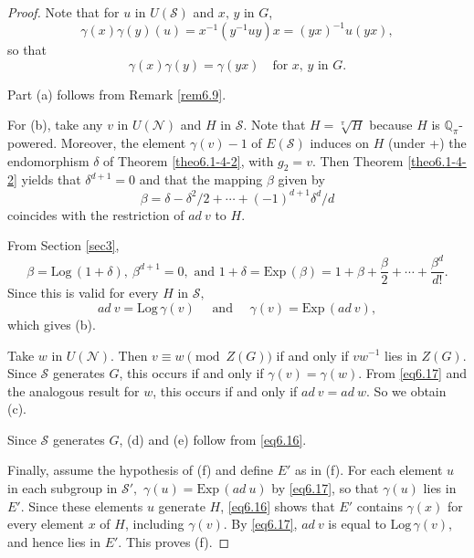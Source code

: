 \documentclass[mathscr]{amsart}
\theoremstyle{theorem}
\theoremstyle{definition}
\numberwithin{equation}{section}
\def \({\left(}
\def \){\right)}
\def\Q{\mathbb{Q}}
\def\S{\mathcal{S}}
\def \Exp{\text{Exp}\,}
\def \Log{\text{Log}\,}
\begin{document}
\begin{proof}
Note that for $u$ in $U(\S)$ and $x,\,y$ in $G$,
$$\gamma(x)\gamma(y)(u)=x^{-1}\(y^{-1}uy\)x=(yx)^{-1}u(yx),$$
so that
\begin{equation}\label{eq6.16}
\gamma(x)\gamma(y)=\gamma(yx)\quad\text{for $x,\,y$ in $G.$}
\end{equation}

Part (a) follows from Remark \ref{rem6.9}.

For (b), take any $v$ in $U(\mathcal{N})$ and $H$ in $\S$. Note that
$H=\sqrt[\pi]{H}$ because $H$ is $\Q_\pi$-powered. Moreover, the
element $\gamma(v)-1$ of $E(\S)$ induces on $H$ (under +) the
endomorphism $\delta$ of Theorem \ref{theo6.1-4-2}, with $g_2=v.$
Then Theorem \ref{theo6.1-4-2} yields that $\delta^{d+1}=0$ and that
the mapping $\beta$ given by
$$\beta=\delta-\delta^2/2+\cdots+(-1)^{d+1}\delta^d/d$$
coincides with the restriction of $ad\ v$ to $H$.

From Section \ref{sec3},
$$\beta=\Log(1+\delta),\ \beta^{d+1}=0,\text{ and }1+\delta=\Exp(\beta)=
1+\beta+\frac{\beta}2+\cdots+\frac{\beta^d}{d!}.$$ Since this is
valid for every $H$ in $\S,$
\begin{equation}\label{eq6.17}
ad\ v=\Log \gamma(v)\quad\text{ and }\quad\gamma(v)=\Exp(ad\ v),
\end{equation}
which gives (b).

Take $w$ in $U(\mathcal{N})$. Then $v\equiv w\pmod{Z(G)}$ if and
only if $vw^{-1}$ lies in $Z(G)$. Since $\S$ generates $G$, this
occurs if and only if $\gamma(v)=\gamma(w)$. From \eqref{eq6.17} and
the analogous result for $w$, this occurs if and only if $ad\ v=ad\
w.$ So we obtain (c).

Since $\S$ generates $G$, (d) and (e) follow from \eqref{eq6.16}.

Finally, assume the hypothesis of (f) and define $E'$ as in (f). For
each element $u$ in each subgroup in $\S',$ $\gamma(u)=\Exp(ad\ u)$
by \eqref{eq6.17}, so that $\gamma(u)$ lies in $E'$. Since these
elements $u$ generate $H$, \eqref{eq6.16} shows that $E'$ contains
$\gamma(x)$ for every element $x$ of $H$, including $\gamma(v)$. By
\eqref{eq6.17}, $ad\ v$ is equal to $\Log\gamma(v)$, and hence lies
in $E'$. This proves (f).
\end{proof}
\end{document}
